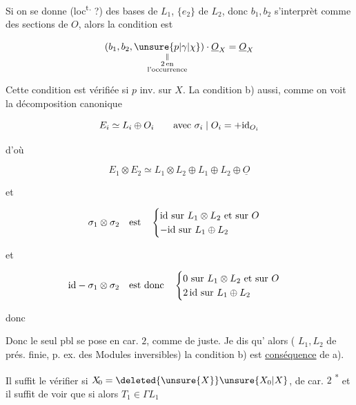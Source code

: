 

Si on se donne (loc\textsuperscript{t.} ?) des bases   de $L_1$, $\{e_2\}$ de $L_2$, donc $b_1,b_2$ s'interprèt comme des sections de $O$, alors la condition est

\[ (b_1,b_2,\underset{\substack{\Vert\\2\,\text{en}\\\text{l'occurrence}}}{\unsure{p|\gamma|\chi}})\cdot\underline{O}_X=\underline{O}_X \]

Cette condition est vérifiée si $p$  inv. sur $X$. La condition b) aussi, comme on voit  la décomposition canonique

\[ E_i\simeq L_i\oplus O_i\qquad\text{avec }\sigma_i\mid O_i=+{\rm id}_{O_i} \]

d'où

\[ E_1\otimes E_2\simeq L_1\otimes L_2\oplus L_1\oplus L_2\oplus\underline O \]

et

\[ \sigma_1\otimes\sigma_2\quad\text{est}\quad\begin{cases}{\rm id}\text{ sur }L_1\otimes L_2\text{ et sur }O\\-{\rm id}\text{ sur }L_1\oplus L_2\end{cases} \]

et

\[ {\rm id}-\sigma_1\otimes\sigma_2\quad\text{est donc}\quad\begin{cases}0\text{ sur }L_1\otimes L_2\text{ et sur }O\\2\,{\rm id}\text{ sur }L_1\oplus L_2\end{cases} \]

donc


Donc le seul pbl se pose en car. $2$, comme de juste. Je dis qu' alors ( $L_1,L_2$ de prés. finie\unsure{\}|)}, p. ex. des Modules inversibles) la condition b) est \uline{conséquence} de a).


Il suffit le vérifier  si $X_{\!0}=\deleted{\unsure{X}}\unsure{X_0|X}$, de car. $2$ \textsuperscript{*} et il suffit de voir que si alors $T_1\in\Gamma L_1$
